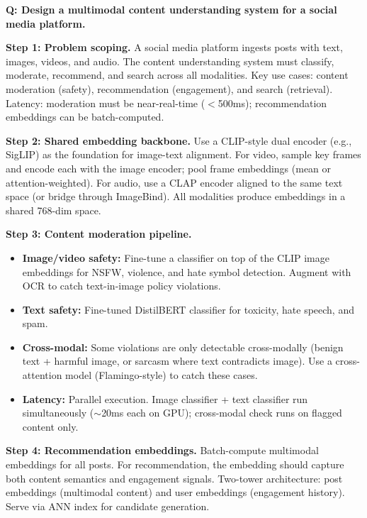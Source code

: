 \begin{interviewq}
\textbf{Q: Design a multimodal content understanding system for a social media platform.}

 \quad {} \quad \badgefreq{\freqhigh}

\stronganswer

\textbf{Step 1: Problem scoping.} A social media platform ingests posts with text, images, videos, and audio. The content understanding system must classify, moderate, recommend, and search across all modalities. Key use cases: content moderation (safety), recommendation (engagement), and search (retrieval). Latency: moderation must be near-real-time ($<$500ms); recommendation embeddings can be batch-computed.

\textbf{Step 2: Shared embedding backbone.} Use a CLIP-style dual encoder (e.g., SigLIP) as the foundation for image-text alignment. For video, sample key frames and encode each with the image encoder; pool frame embeddings (mean or attention-weighted). For audio, use a CLAP encoder aligned to the same text space (or bridge through ImageBind). All modalities produce embeddings in a shared 768-dim space.

\textbf{Step 3: Content moderation pipeline.}
\begin{itemize}
    \item \textbf{Image/video safety:} Fine-tune a classifier on top of the CLIP image embeddings for NSFW, violence, and hate symbol detection. Augment with OCR to catch text-in-image policy violations.
    \item \textbf{Text safety:} Fine-tuned DistilBERT classifier for toxicity, hate speech, and spam.
    \item \textbf{Cross-modal:} Some violations are only detectable cross-modally (benign text + harmful image, or sarcasm where text contradicts image). Use a cross-attention model (Flamingo-style) to catch these cases.
    \item \textbf{Latency:} Parallel execution. Image classifier + text classifier run simultaneously ($\sim$20ms each on GPU); cross-modal check runs on flagged content only.
\end{itemize}

\textbf{Step 4: Recommendation embeddings.} Batch-compute multimodal embeddings for all posts. For recommendation, the embedding should capture both content semantics and engagement signals. Two-tower architecture: post embeddings (multimodal content) and user embeddings (engagement history). Serve via ANN index for candidate generation.


\end{interviewq}
